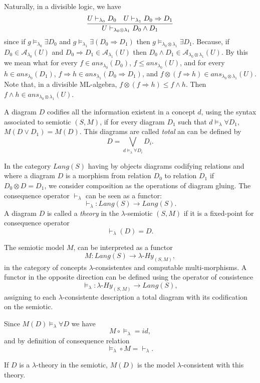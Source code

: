 \documentclass[oribibl]{llncs}
\newcommand{\A}{\mathcal{A}}
\begin{document}
Naturally, in a divisible logic, we have
\[
\infer{U\vdash_{\lambda_0\otimes\lambda_1} D_0\wedge D_1}{U\vdash_{\lambda_0}
D_0 &  U\vdash_{\lambda_1}D_0\Rightarrow D_1}
\]
since if $g\models_{\lambda_0} \exists D_0$ and $g\models_{\lambda_1} \exists (D_0\Rightarrow D_1)$ then $g\models_{\lambda_0\otimes\lambda_1} \exists D_1$. Because, if $D_0\in\A_{\lambda_0}(U)$ and $D_0\Rightarrow
D_1\in\A_{\lambda_1}(U)$ then
$D_0\wedge D_1\in\A_{\lambda_0\otimes\lambda_1}(U)$. By this we mean what for
every $f\in ans_{\lambda_0}(D_0)$, $f\leq ans_{\lambda_0}(U)$, and
for every $h\in ans_{\lambda_0}(D_1)$, $f\Rightarrow h\in
ans_{\lambda_1}(D_0\Rightarrow D_1)$, and $f\otimes(f\Rightarrow
h)\in ans_{\lambda_0\otimes\lambda_1}(U)$. Note that, in a divisible ML-algebra, $f\otimes(f\Rightarrow h)\leq f\wedge h$. Then $f\wedge h\in ans_{\lambda_0\otimes\lambda_1}(U)$.

A diagram $D$ codifies all the information existent in a concept $d$, using the syntax associated to semiotic $(S,M)$, if for every diagram $D_1$ such that $d\models_\lambda \forall D_1$, $M(D\vee D_1)=M(D)$. This diagrams are called \emph{total} an can be defined by \[D=\bigvee_{d\models_\lambda \forall D_i} D_i.\]

In the category $Lang(S)$ having by objects diagrams codifying relations and where a diagram $D$ is a morphism from relation $D_0$ to relation $D_1$ if $D_0\otimes D =D_1$, we consider composition as the operations of diagram gluing. The consequence operator $\vdash_\lambda$ can be seen as a functor:
\[
\vdash_\lambda:Lang(S)\rightarrow Lang(S).
\]
A diagram $D$ is called a \emph{theory} in the $\lambda$-semiotic $(S,M)$ if it is a fixed-point for consequence operator \[\vdash_\lambda(D)=D.\]

The semiotic model $M$, can be interpreted as a functor \[M:Lang(S)\rightarrow\lambda\text{-}Hy_{(S,M)},\]
in the category of concepts $\lambda$-consistentes and computable multi-morphisms. A functor in the opposite direction can be defined using  the operator of consistence
\[\models_\lambda:\lambda\text{-}Hy_{(S,M)}\rightarrow Lang(S),\]
assigning to each $\lambda$-consistente description a total diagram with its codification on the semiotic.

Since $M(D)\models_\lambda\forall D$ we have
\[M\circ \models_\lambda = id,\]
and by definition of consequence relation
\[\models_\lambda\circ M = \vdash_\lambda.\]

If $D$ is a $\lambda$-theory in the semiotic, $M(D)$ is the model $\lambda$-consistent with this theory.
\end{document}
